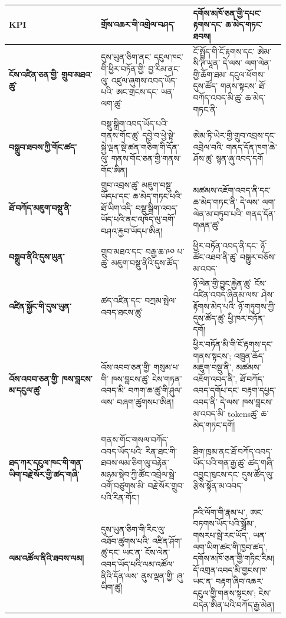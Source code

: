 \documentclass[11pt]{article}
\begin{document}
\begin{longtable}{P{0.31\linewidth} P{0.31\linewidth} P{0.31\linewidth}}
\toprule
KPI & གྲོས་འཆར་གི་འགྲེལ་བཤད་ & དགོས་མཁོ་ཅན་གྱི་དཔང་རྟགས་དང་ ཆ་མེད་གཏང་ཐབས། \\
\midrule
\endhead
\textbf{ངོས་འཛིན་ཅན་གྱི་ གྲུབ་མཐའ་ཚུ་} & དུས་ཡུན་ཅིག་ནང་ དངུལ་ཁང་གི་ཕྱིར་བཏོན་གྱི་ བྱ་རིམ་ནང་ལུ་ འཛུལ་ཞུགས་འབད་ཡོད་པའི་ ཨང་གྲངས་དང་ ཡན་ལག་ཚུ་ & ངོ་སྤྲོད་གི་ངོ་རྟགས་དང་ ཨེམ་སི་ཊི་ཡཱན་ དེ་ལས་ ལག་ལེན་གྱི་ཆོག་ཐམ་ དངུལ་ཕོགས་ དུས་ཚོད་ གནས་སྟངས་ ཐོ་བཀོད་འབད་མི་ཚུ་ ཆ་མེད་གཏང་ནི་ \\
\textbf{བསྒྲུབ་ཐབས་ཀྱི་གོང་ཚད་} & བསྡུ་སྒྲིག་འབད་ཡོད་པའི་གནས་གོང་ཚུ་ དབྱེ་བ་ཕྱེ་སྟེ་ སྐྱེ་ལྡན་སྡེ་ཚན་གཅིག་གི་དོན་ལུ་ གནས་གོང་ཅན་གྱི་གནས་གོང་ཨིན། & ཨེམ་ཏི་ཡེར་གྱི་གྲུབ་འབྲས་དང་འབྲེལ་བའི་ གནད་དོན་ཁག་ཆེ་ཤོས་ཚུ་ སྙན་ཞུ་འབད་དགོ \\
\textbf{ཐོ་བཀོད་མཇུག་བསྡུ་ནི་} & གྲུབ་འབྲས་ཚུ་ མཇུག་བསྡུ་ཡོདཔ་དང་ ཆ་མེད་གཏང་པའི་ཐོ་ཡིག་འདི་ བསྡུ་སྒྲིག་འབད་ཡོད་པའི་ནང་འཁོད་ལུ་བགོ་བཤའ་རྐྱབ་ཡོདཔ་ཨིན། & མཚམས་འཇོག་འབད་ནི་དང་ ཆ་མེད་གཏང་ནི་ དེ་ལས་ ལག་ལེན་མ་བཏུབ་པའི་ གནད་དོན་གཞན་ཚུ་ \\
\textbf{བསྒྲུབ་ནིའི་དུས་ཡུན་} & གྲུབ་མཐའ་དང་ བརྒྱ་ཆ་༩༠ པ་ཚུ་ མཇུག་བསྡུ་ནིའི་དུས་ཚོད་ & ཕྱིར་བཏོན་འབད་ནི་དང་ ཉོ་ཚོང་འཐབ་ནི་ཚུ་ བསྒྱུར་བཅོས་མ་འབད་ \\
\textbf{འཛིན་སྐྱོང་གི་དུས་ཡུན་} & ཚད་འཛིན་དང་ བཀྲམ་སྤེལ་འབད་ཐངས་ཚུ་ & ཉོ་ལེན་གྱི་བྱུང་རྐྱེན་ཚུ་ ངོས་འཛིན་འབད་ཞིནམ་ལས་ ཤེས་རྟོགས་མེད་པའི་ ཉོ་གཏུགས་ཀྱི་དུས་ཚོད་ཚུ་ ཕྱི་ཁར་བཏོན་དགོ། \\
\textbf{འོས་འབབ་ཅན་གྱི་ ཁས་བླངས་མ་དངུལ་ཚུ་} & འོས་འབབ་ཅན་གྱི་ གསུམ་པ་གི་ ཁས་བླངས་ཚུ་ ངེས་གཏན་འབད་མི་ བཀག་ཆ་ཚུ་གི་ཤུལ་ལས་ བཞག་ཚུགསཔ་ཨིན། & ཕྱིར་བཏོན་མི་གི་ངོ་རྟགས་དང་ གནས་སྟངས་; འཁྲུན་ཆོད་མཇུག་བསྡུ་ནི་, མཚམས་འཇོག་འབད་ནི་, ཐོ་བཀོད་འབད་དགོཔ་དང་ བརྟག་དཔྱད་འབད་ནི་ དེ་ལས་ ཁས་བླངས་མ་འབད་མི་ tokensཚུ་ ཆ་མེད་གཏང་དགོ། \\
\textbf{ཐད་ཀར་དངུལ་ཁང་གི་གན་ཡིག་བརྗེ་སོར་གྱི་ཚད་གཞི་} & གནས་གོང་གསལ་བཀོད་འབད་ཡོད་པའི་ རིན་ཐང་གི་ཐབས་ལམ་ཅིག་ལུ་བརྟེན་ མཉམ་སྡེབ་ཀྱི་ཚོང་འབྲེལ་སྦེ་འགོ་བཙུགས་མི་ བརྗེ་སོར་གྲུབ་པའི་རིན་གོང་། & ཐིག་ཁྲམ་ནང་ཐོ་བཀོད་འབད་ཡོད་པའི་གན་རྒྱ་ཚུ་ ཚད་གཞི་འབྱུང་ཁུངས་དང་ དུས་ཚོད་ལུ་རྩིས་སྟོན་མ་འབད་ \\
\textbf{ལམ་འཚོལ་ནིའི་ཐབས་ལམ།} & དུས་ཡུན་ཅིག་གི་རིང་ལུ་ འཐོབ་ཚུགས་པའི་ འཛིན་ཤོག་ཚུ་དང་ ཡང་ན་ ངོས་ལེན་འབད་ཡོད་པའི་ལམ་འཚོལ་ནིའི་དོན་ལས་ ནུས་ལྡན་གྱི་ ཞུ་ཡིག་ཚུ། & ཌའི་ལོག་གི་རྣམ་པ་, ཨང་བཏགས་ཡོད་པའི་སྒྲོམ་, གསརཔ་སྦེ་རང་ཡོད་, ཡན་ལག་ཡིག་ཚང་གི་ཁྱབ་ཚད་, དགོས་མཁོ་ཅན་གྱི་གཏིང་རིམ། དོ་འགྲན་འབད་མི་གྱངས་ཁ་ ཡང་ན་ བརྟག་ཞིབ་འཆར་དངུལ་གྱི་གནས་སྟངས་; ངེས་བདེན་ཨིན་པའི་བཀོད་རྒྱ་མེན། \\

\end{longtable}
\end{document}
